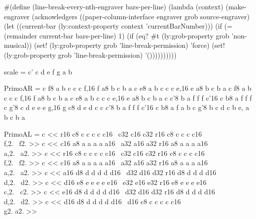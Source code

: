 #(define (line-break-every-nth-engraver bars-per-line)
  (lambda (context)
     (make-engraver 
       (acknowledgers ((paper-column-interface engraver grob source-engraver)
         (let ((current-bar (ly:context-property context 'currentBarNumber)))
           (if (= (remainder current-bar bars-per-line) 1) 
               (if (eq? #t (ly:grob-property grob 'non-musical)) 
                   (set! (ly:grob-property grob 'line-break-permission) 'force) 
                   (set! (ly:grob-property grob 'line-break-permission) '())))))))))




scale = \relative c' { c d e f g a b }


PrimoAR = {
  { \relative c { f8 a b c c c f,16 f a8 b c b a } }
  { \relative c { e8 a b c c c e,16 e a8 b c b a } }
  { \relative c { f8 a b c c c f,16 f a8 b c b a } }
  { \relative c { e8 a b c c c e,16 e a8 b c b a } }
  { \relative c { c'8 b a f f f c'16 c b8 a f f f } }
  { \relative c { g'8 c d e e e g,16 g c8 d e d c } }
  { \relative c { c'8 b a f f f c'16 c b8 a f a b } }
  { \relative c { g'8 b c d c b e, a b c b a } }
}

PrimoAL = {
  { \relative c { << { r16 c8 c c c c c16~ c32 c16 c32 r16 c8 c c c c16~ } \\ { f,2.~ f2. } >> } }
  { \relative c { << { c16 a8 a a a a a16~ a32 a16 a32 r16 a8 a a a a16 } \\ { a,2.~ a2. } >> } }
  { \relative c { << { r16 c8 c c c c c16~ c32 c16 c32 r16 c8 c c c c16~ } \\ { f,2.~ f2. } >> } }
  { \relative c { << { c16 a8 a a a a a16~ a32 a16 a32 r16 a8 a a a a16~ } \\ { a,2.~ a2. } >> } }
  { \relative c { << { a16 d8 d d d d d16~ d32 d16 d32 r16 d8 d d d d16~ } \\ { d,2.~ d2. } >> } }
  { \relative c { << { d16 e8 e e e e e16~ e32 e16 e32 r16 e8 e e e e16 } \\ { c,2.~ c2. } >> } }
  { \relative c { << { e16 d8 d d d d d16~ d32 d16 d32 r16 d8 d d d d16~ } \\ { d,2.~ d2. } >> } }
  { \relative c { << { d16 d8 d d d d d16~ d16 c8 c c c c c16 } \\ { g2. a2. } >> } }
}

